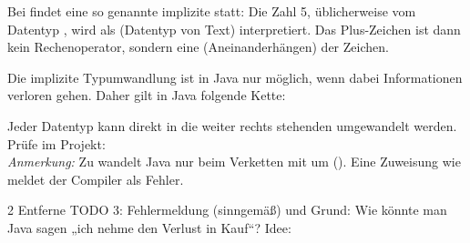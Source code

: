 \documentclass[11pt,a4paper]{article}
\begin{document}
\begin{merke}\lueckentext
Bei  findet eine so genannte implizite  statt: Die Zahl 5, üblicherweise vom Datentyp , wird als  (Datentyp von Text) interpretiert. Das Plus-Zeichen ist dann kein Rechenoperator, sondern eine  (Aneinanderhängen) der Zeichen.

Die implizite Typumwandlung ist in Java nur möglich, wenn dabei  Informationen verloren gehen. Daher gilt in Java folgende Kette:
\begin{center}
\end{center}
Jeder Datentyp kann direkt in die weiter rechts stehenden umgewandelt werden.\\
Prüfe im Projekt:  \quad {} \\
{\small\textit{Anmerkung:} Zu  wandelt Java nur beim Verketten mit \code{+} um (). Eine Zuweisung wie \mbox{} meldet der Compiler als Fehler.}
\end{merke}

\newpage
\begin{aufgabe}{2}
Entferne TODO 3:  \quad Fehlermeldung (sinngemäß) und Grund:
Wie könnte man Java sagen „ich nehme den Verlust in Kauf“? Idee:
\end{aufgabe}
\end{document}
